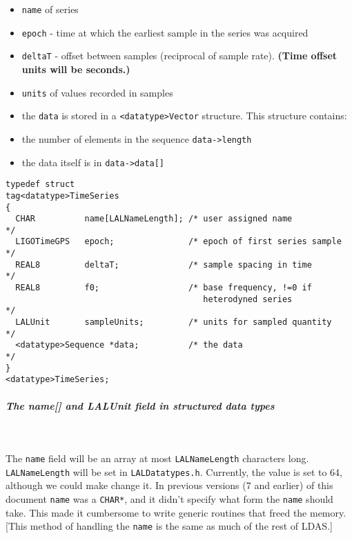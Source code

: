 \documentclass[]{ligodcc}
\renewcommand{\texttt}[1]{{\ttfamily\color{blue}#1}}
\begin{document}
\begin{itemize}
\vspace{-0.15in}
\item
{\tt name} of series
\vspace{-0.15in}
\item
{\tt epoch} - time at which the earliest sample in the series was acquired
\vspace{-0.15in}
\item
{\tt deltaT} -  offset between samples (reciprocal of sample rate).  
{\bf (Time offset units will be seconds.)}
\vspace{-0.15in}
\item
{\tt units} of values recorded in samples
\vspace{-0.15in}
\item
the {\tt data} is stored in a  {\tt <datatype>Vector}  structure. This structure contains:
\vspace{-0.15in}
\item
the number of elements in the sequence {\tt data->length}
\vspace{-0.15in}
\item
the data itself is in {\tt data->data[]}
\end{itemize}

{\footnotesize
\begin{verbatim}
typedef struct
tag<datatype>TimeSeries
{
  CHAR          name[LALNameLength]; /* user assigned name           */
  LIGOTimeGPS   epoch;               /* epoch of first series sample */
  REAL8         deltaT;              /* sample spacing in time       */
  REAL8         f0;                  /* base frequency, !=0 if
                                        heterodyned series           */
  LALUnit       sampleUnits;         /* units for sampled quantity   */
  <datatype>Sequence *data;          /* the data                     */
}
<datatype>TimeSeries;
\end{verbatim}}


\subparagraph[LALUnit data type]{The {\texttt {name[]}} 
and {\texttt {LALUnit}} field in structured data types }~
\label{name}

\noindent
The {\tt name} field will be an array at most {\tt LALNameLength} characters long.
{\tt LALNameLength} will be set in {\tt LALDatatypes.h}.  Currently, the value is
set to 64, although we could make change it.  In previous versions (7
and earlier) of this document {\tt name} was a {\tt CHAR*}, and it didn't specify
what form the {\tt name} should take.  This made it cumbersome  to write
generic routines that freed the memory.  [This method of handling the
{\tt name} is the same as much of the rest of LDAS.] 
\end{document}

